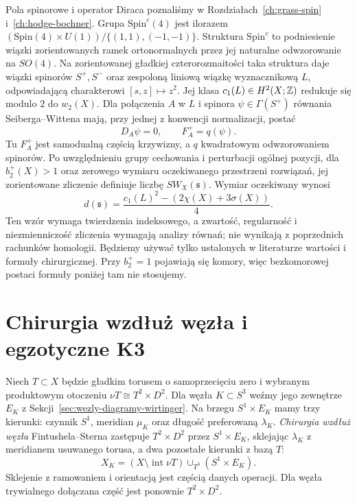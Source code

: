 Pola spinorowe i operator Diraca poznaliśmy w
Rozdziałach~\ref{ch:grass-spin}
i~\ref{ch:hodge-bochner}. Grupa
$\mathrm{Spin}^c(4)$ jest ilorazem
$(\mathrm{Spin}(4)\times U(1))/\{(1,1),(-1,-1)\}$.
Struktura $\mathrm{Spin}^c$ to podniesienie wiązki
zorientowanych ramek ortonormalnych przez jej naturalne
odwzorowanie na $SO(4)$. Na zorientowanej gładkiej
czterorozmaitości taka struktura daje
wiązki spinorów $S^+,S^-$ oraz zespoloną liniową
wiązkę wyznacznikową $L$, odpowiadającą charakterowi
$[s,z]\mapsto z^2$. Jej klasa
$c_1(L)\in H^2(X;\mathbb{Z})$ redukuje się modulo $2$
do $w_2(X)$. Dla połączenia $A$ w $L$ i spinora
$\psi\in\Gamma(S^+)$ równania Seiberga--Wittena
mają, przy jednej z konwencji normalizacji, postać
\[
 D_A\psi=0,\qquad F_A^+=q(\psi).
\]
Tu $F_A^+$ jest samodualną częścią krzywizny,
a $q$ kwadratowym odwzorowaniem spinorów.
Po uwzględnieniu grupy cechowania i perturbacji
ogólnej pozycji, dla $b_2^+(X)>1$ oraz zerowego
wymiaru oczekiwanego przestrzeni rozwiązań,
jej zorientowane zliczenie definiuje liczbę
$SW_X(\mathfrak s)$. Wymiar oczekiwany wynosi
\[
 d(\mathfrak s)=
 \frac{c_1(L)^2-(2\chi(X)+3\sigma(X))}{4}.
\]
Ten wzór wymaga twierdzenia indeksowego, a zwartość,
regularność i niezmienniczość zliczenia wymagają
analizy równań; nie wynikają z poprzednich rachunków
homologii. Będziemy używać tylko ustalonych w literaturze
wartości i formuły chirurgicznej. Przy $b_2^+=1$
pojawiają się komory, więc bezkomorowej postaci
formuły poniżej tam nie stosujemy.

\section{Chirurgia wzdłuż węzła i egzotyczne K3}
\label{sec:chirurgia-wezel-cztery}

Niech $T\subset X$ będzie gładkim torusem o
samoprzecięciu zero i wybranym produktowym
otoczeniu $\nu T\cong T^2\times D^2$. Dla węzła
$K\subset S^3$ weźmy jego zewnętrze $E_K$
z Sekcji~\ref{sec:wezly-diagramy-wirtinger}.
Na brzegu $S^1\times E_K$ mamy trzy kierunki:
czynnik $S^1$, meridian $\mu_K$ oraz długość
preferowaną $\lambda_K$. \emph{Chirurgia wzdłuż węzła}
Fintushela--Sterna zastępuje $T^2\times D^2$ przez
$S^1\times E_K$, sklejając $\lambda_K$ z meridianem
usuwanego torusa, a dwa pozostałe kierunki z bazą $T$:
\[
 X_K=(X\setminus\operatorname{int}\nu T)
       \cup_{T^3}(S^1\times E_K).
\]
Sklejenie z ramowaniem i orientacją jest częścią
danych operacji. Dla węzła trywialnego dołączana
część jest ponownie $T^2\times D^2$.

